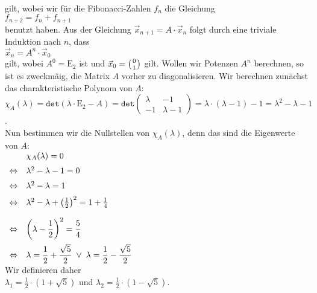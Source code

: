 \\[0.2cm]
gilt, wobei wir f\"ur die Fibonacci-Zahlen $f_n$ die Gleichung
\\[0.2cm]
\hspace*{1.3cm}
$f_{n+2} = f_n + f_{n+1}$
\\[0.2cm]
benutzt haben.   Aus der Gleichung $\vec{x}_{n+1} = A \cdot\vec{x}_n$ 
folgt durch eine triviale Induktion nach $n$, dass
\\[0.2cm]
\hspace*{1.3cm}
$\vec{x}_n = A^n \cdot\vec{x}_0$
\\[0.2cm]
gilt, wobei $A^0 = \mathrm{E}_2$ ist und $\vec{x}_0 = \left(0 \atop 1\right)$ gilt.  Wollen wir
Potenzen $A^n$ berechnen, so ist es zweckm\"a\3ig, die Matrix $A$ vorher zu diagonalisieren.  Wir
berechnen zun\"achst das charakteristische Polynom von $A$:
\\[0.2cm]
\hspace*{1.3cm}
$\chi_A(\lambda) = \mathtt{det}(\lambda \cdot \mathrm{E}_2 - A) 
 = \mathtt{det}\left(
   \begin{array}{rr}
     \lambda  &  -1 \\
     -1       & \lambda - 1
   \end{array}
   \right) = \lambda \cdot (\lambda - 1) - 1 = \lambda^2 - \lambda - 1
$.
\\[0.2cm]
Nun bestimmen wir die Nullstellen von $\chi_A(\lambda)$, denn das sind die Eigenwerte von $A$:
\\[0.2cm]
\hspace*{1.3cm}
$
\begin{array}[t]{ll}
                & \chi_A(\lambda) = 0 \\[0.2cm]
\Leftrightarrow & \lambda^2 - \lambda - 1 = 0 \\[0.2cm] 
\Leftrightarrow & \lambda^2 - \lambda     = 1 \\[0.2cm]
\Leftrightarrow & \lambda^2 - \lambda + \left(\frac{1}{2}\right)^2 = 1 + \frac{1}{4} \\[0.4cm]
\Leftrightarrow & \displaystyle\left(\lambda - \frac{1}{2}\right)^2 = \frac{5}{4} \\[0.4cm]
\Leftrightarrow & \displaystyle\lambda = \frac{1}{2} + \frac{\sqrt{5}}{2} \;\vee\; \lambda = \frac{1}{2} - \frac{\sqrt{5}}{2} 
\end{array}
$
\\[0.2cm]
Wir definieren daher
\\[0.2cm]
\hspace*{1.3cm}
$\lambda_1 = \frac{1}{2}\cdot(1 + \sqrt{5})$ \quad und \quad $\lambda_2 = \frac{1}{2}\cdot(1 - \sqrt{5})$.
